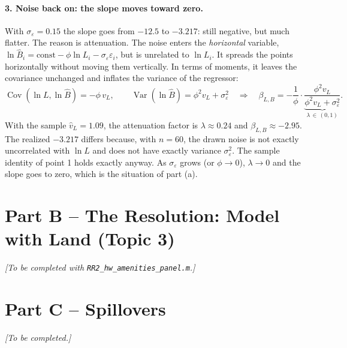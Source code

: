 \documentclass[11pt,a4paper]{article}
\begin{document}
\paragraph{3. Noise back on: the slope moves toward zero.}
With $\sigma_\varepsilon = 0.15$ the slope goes from $-12.5$ to $-3.217$: still negative, but much flatter. The reason is attenuation. The noise enters the \emph{horizontal} variable, $\ln \hat B_i = \text{const} - \phi\ln L_i - \sigma_\varepsilon\varepsilon_i$, but is unrelated to $\ln L_i$. It spreads the points horizontally without moving them vertically. In terms of moments, it leaves the covariance unchanged and inflates the variance of the regressor:
\begin{equation}
    \operatorname{Cov}(\ln L, \ln \hat B) = -\phi\, v_L, \qquad
    \operatorname{Var}(\ln \hat B) = \phi^2 v_L + \sigma_\varepsilon^2
    \quad\Longrightarrow\quad
    \beta_{L,B} = -\frac{1}{\phi}\cdot\underbrace{\frac{\phi^2 v_L}{\phi^2 v_L + \sigma_\varepsilon^2}}_{\lambda \,\in\, (0,1)} .
\end{equation}
With the sample $\hat v_L = 1.09$, the attenuation factor is $\lambda \approx 0.24$ and $\beta_{L,B} \approx -2.95$. The realized $-3.217$ differs because, with $n = 60$, the drawn noise is not exactly uncorrelated with $\ln L$ and does not have exactly variance $\sigma_\varepsilon^2$. The sample identity of point 1 holds exactly anyway. As $\sigma_\varepsilon$ grows (or $\phi \to 0$), $\lambda \to 0$ and the slope goes to zero, which is the situation of part (a).

\newpage
\section*{Part B -- The Resolution: Model with Land (Topic 3)}
\textit{[To be completed with \texttt{RR2\_hw\_amenities\_panel.m}.]}

\newpage
\section*{Part C -- Spillovers}
\textit{[To be completed.]}
\end{document}
